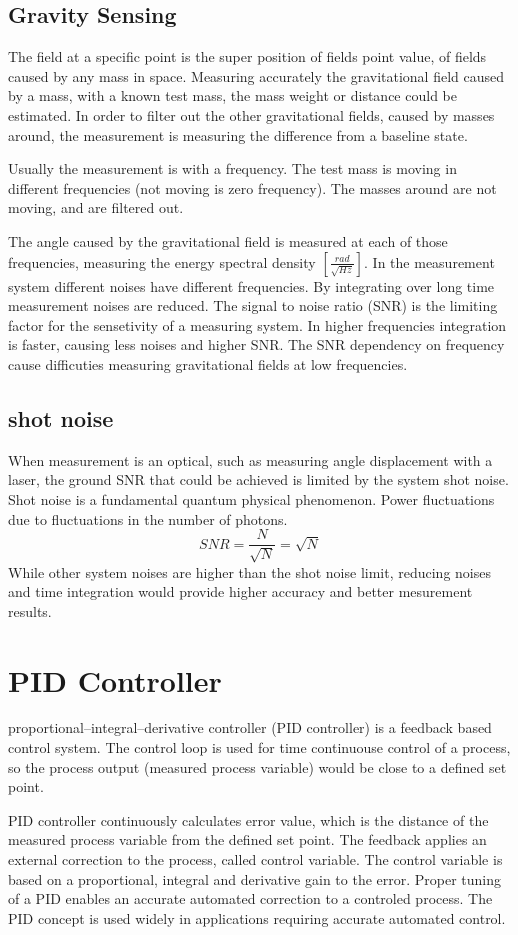 \documentclass[\main/master.tex]{subfiles}
\begin{document}
\subsection{Gravity Sensing}
The field at a specific point is the super position of fields point value, of fields caused by any mass in space. Measuring accurately the gravitational field caused by a mass, with a known test mass, the mass weight or distance could be estimated. In order to filter out the other gravitational fields, caused by masses around, the measurement is measuring the difference from a baseline state.
\par
Usually the measurement is with a frequency. The test mass is moving in different frequencies (not moving is zero frequency). The masses around are not moving, and are filtered out.
\par
The angle caused by the gravitational field is measured at each of those frequencies, measuring the energy spectral density $[\frac{rad}{\sqrt{Hz}}]$.
In the measurement system different noises have different frequencies. By integrating over long time measurement noises are reduced. The signal to noise ratio (SNR) is the limiting factor for the sensetivity of a measuring system. In higher frequencies integration is faster, causing less noises and higher SNR.
The SNR dependency on frequency cause difficuties measuring gravitational fields at low frequencies.

\subsection{shot noise}
When measurement is an optical, such as measuring angle displacement with a laser, the ground SNR that could be achieved is limited by the system shot noise. Shot noise is a fundamental quantum physical phenomenon. Power fluctuations due to fluctuations in the number of photons. 
\begin{equation}
SNR = \frac{N}{\sqrt{N}} = \sqrt{N}    \label{eqn:shot_noise}
\end{equation}
While other system noises are higher than the shot noise limit, reducing noises and time integration would provide higher accuracy and better mesurement results. 



\section{PID Controller}
proportional–integral–derivative controller (PID controller) is a feedback based control system. The control loop is used for time continuouse control of a process, so the process output (measured process variable) would be close to a defined set point.
\par
PID controller continuously calculates error value, which is the distance of the measured process variable from the defined set point. The feedback applies an external correction to the process, called control variable. The control variable is based on a proportional, integral and derivative gain to the error. Proper tuning of a PID enables an accurate automated correction to a controled process. The PID concept is used widely in applications requiring accurate automated control.
\end{document}
